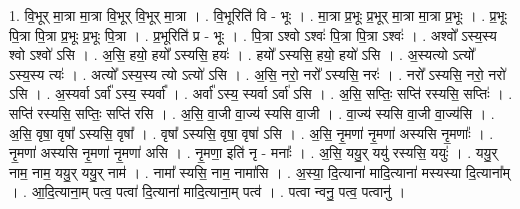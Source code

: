 \documentclass[17pt]{extarticle}
\begin{document}
1. वि॒भूर् मा॒त्रा मा॒त्रा वि॒भूर् वि॒भूर् मा॒त्रा । . वि॒भूरिति॑ वि - भूः । . मा॒त्रा प्र॒भूः प्र॒भूर् मा॒त्रा मा॒त्रा प्र॒भूः । . प्र॒भूः पि॒त्रा पि॒त्रा प्र॒भूः प्र॒भूः पि॒त्रा । . प्र॒भूरिति॑ प्र - भूः । . पि॒त्रा ऽश्वो ऽश्वः॑ पि॒त्रा पि॒त्रा ऽश्वः॑ । . अश्वो᳚ ऽस्य॒स्य श्वो ऽश्वो॑ ऽसि । . अ॒सि॒ हयो॒ हयो᳚ ऽस्यसि॒ हयः॑ । . हयो᳚ ऽस्यसि॒ हयो॒ हयो॑ ऽसि । . अ॒स्यत्यो ऽत्यो᳚ ऽस्य॒स्य त्यः॑ । . अत्यो᳚ ऽस्य॒स्य त्यो ऽत्यो॑ ऽसि । . अ॒सि॒ नरो॒ नरो᳚ ऽस्यसि॒ नरः॑ । . नरो᳚ ऽस्यसि॒ नरो॒ नरो॑ ऽसि । . अ॒स्यर्वा ऽर्वा᳚ ऽस्य॒ स्यर्वा᳚ । . अर्वा᳚ ऽस्य॒ स्यर्वा ऽर्वा॑ ऽसि । . अ॒सि॒ सप्तिः॒ सप्ति॑ रस्यसि॒ सप्तिः॑ । . सप्ति॑ रस्यसि॒ सप्तिः॒ सप्ति॑ रसि । . अ॒सि॒ वा॒जी वा॒ज्य॑ स्यसि वा॒जी । . वा॒ज्य॑ स्यसि वा॒जी वा॒ज्य॑सि । . अ॒सि॒ वृषा॒ वृषा᳚ ऽस्यसि॒ वृषा᳚ । . वृषा᳚ ऽस्यसि॒ वृषा॒ वृषा॑ ऽसि । . अ॒सि॒ नृ॒मणा॑ नृ॒मणा॑ अस्यसि नृ॒मणाः᳚ । . नृ॒मणा॑ अस्यसि नृ॒मणा॑ नृ॒मणा॑ असि । . नृ॒मणा॒ इति॑ नृ - मनाः᳚ । . अ॒सि॒ ययु॒र् ययु॑ रस्यसि॒ ययुः॑ । . ययु॒र् नाम॒ नाम॒ ययु॒र् ययु॒र् नाम॑ । . नामा᳚ स्यसि॒ नाम॒ नामा॑सि । . अ॒स्या॒ दि॒त्याना॑ मादि॒त्याना॑ मस्यस्या दि॒त्याना᳚म् । . आ॒दि॒त्याना॒म् पत्व॒ पत्वा॑ दि॒त्याना॑ मादि॒त्याना॒म् पत्व॑ । . पत्वा न्वनु॒ पत्व॒ पत्वानु॑ । \newline
\end{document}
